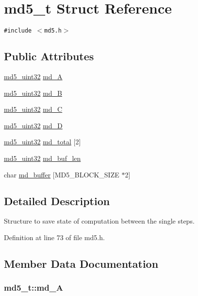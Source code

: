 \hypertarget{structmd5__t}{
\section{md5\_\-t Struct Reference}
\label{structmd5__t}
}
{\tt \#include $<$md5.h$>$}

\subsection*{Public Attributes}
\begin{CompactItemize}
\item 
\hyperlink{md5_8h_a5370400843756f0b77b782bdeef2564}{md5\_\-uint32} \hyperlink{structmd5__t_ab8fa915435774671caea7e7c6e63d19}{md\_\-A}
\item 
\hyperlink{md5_8h_a5370400843756f0b77b782bdeef2564}{md5\_\-uint32} \hyperlink{structmd5__t_1613a6a739dd0837c00af0e9a691b1e5}{md\_\-B}
\item 
\hyperlink{md5_8h_a5370400843756f0b77b782bdeef2564}{md5\_\-uint32} \hyperlink{structmd5__t_3d36bb26874ed330b76a40081317de8f}{md\_\-C}
\item 
\hyperlink{md5_8h_a5370400843756f0b77b782bdeef2564}{md5\_\-uint32} \hyperlink{structmd5__t_e4ca777e18b5fc82bf2ba0fd5a5b6ae6}{md\_\-D}
\item 
\hyperlink{md5_8h_a5370400843756f0b77b782bdeef2564}{md5\_\-uint32} \hyperlink{structmd5__t_9169c98caf650a252cd2dbf3e4544498}{md\_\-total} \mbox{[}2\mbox{]}
\item 
\hyperlink{md5_8h_a5370400843756f0b77b782bdeef2564}{md5\_\-uint32} \hyperlink{structmd5__t_7bf7169ebc0df8192cd2c322b956d81b}{md\_\-buf\_\-len}
\item 
char \hyperlink{structmd5__t_ce5d5c1497a2793065a7abf0d8bccde9}{md\_\-buffer} \mbox{[}MD5\_\-BLOCK\_\-SIZE $\ast$2\mbox{]}
\end{CompactItemize}


\subsection{Detailed Description}
Structure to save state of computation between the single steps. 

Definition at line 73 of file md5.h.

\subsection{Member Data Documentation}
\hypertarget{structmd5__t_ab8fa915435774671caea7e7c6e63d19}{
\subsubsection[md\_\-A]{ {\bf md5\_\-t::md\_\-A}}}
\label{structmd5__t_ab8fa915435774671caea7e7c6e63d19}




